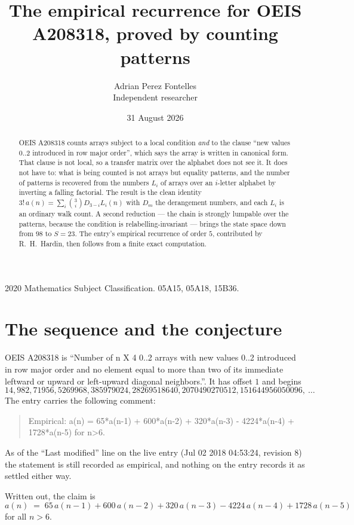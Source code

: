 \documentclass[11pt,a4paper]{article}
\title{The empirical recurrence for OEIS A208318, proved by counting patterns}
\author{Adrian Perez Fontelles\\ \small Independent researcher}
\date{31 August 2026}
\theoremstyle{plain}
\theoremstyle{definition}
\begin{document}
\maketitle

\begin{abstract}
OEIS A208318 counts arrays subject to a local condition \emph{and} to the clause ``new values
$0..2$ introduced in row major order'', which says the array is written in canonical
form. That clause is not local, so a transfer matrix over the alphabet does not see it. It
does not have to: what is being counted is not arrays but equality patterns, and the number
of patterns is recovered from the numbers $L_i$ of arrays over an $i$-letter alphabet by
inverting a falling factorial. The result is the clean identity
$3!\,a(n)=\sum_i\binom{3}{i}D_{3-i}L_i(n)$ with $D_m$ the derangement numbers,
and each $L_i$ is an ordinary walk count. A second reduction --- the chain is strongly
lumpable over the patterns, because the condition is relabelling-invariant --- brings the
state space down from $98$ to $S=23$. The entry's empirical recurrence of order
$5$, contributed by R.~H.~Hardin, then follows from a finite exact computation.
\end{abstract}

\noindent\small 2020 Mathematics Subject Classification. 05A15, 05A18, 15B36.\normalsize

\section{The sequence and the conjecture}

OEIS A208318 is ``Number of n X 4 0..2 arrays with new values 0..2 introduced in row major order and no element equal to more than two of its immediate leftward or upward or left-upward diagonal neighbors.''. It has offset $1$ and begins
\[
14, 982, 71956, 5269968, 385979024, 28269518640, 2070490270512, 151644956050096,\ \dots
\]
The entry carries the following comment:
\begin{quote}\small
Empirical: a(n) = 65*a(n-1) + 600*a(n-2) + 320*a(n-3) - 4224*a(n-4) + 1728*a(n-5) for n>6.
\end{quote}
As of the ``Last modified'' line on the live entry (Jul 02 2018 04:53:24, revision 8) the statement is
still recorded as empirical, and nothing on the entry records it as settled either way.

Written out, the claim is
\begin{equation}\label{eq:conj}
a(n)\;=\;65\,a(n-1) + 600\,a(n-2) + 320\,a(n-3) - 4224\,a(n-4) + 1728\,a(n-5)
\end{equation}
for all $n>6$.
\end{document}
